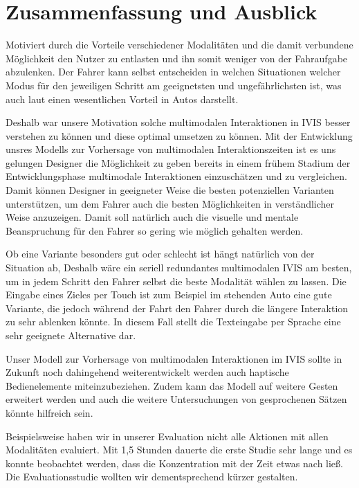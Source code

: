 \chapter{Zusammenfassung und Ausblick}\label{cha:Zusamenfassung}
Motiviert durch die Vorteile verschiedener Modalitäten und die damit verbundene Möglichkeit den Nutzer zu entlasten und ihn somit weniger von der Fahraufgabe abzulenken. Der Fahrer kann selbst entscheiden in welchen Situationen welcher Modus für den jeweiligen Schritt am geeignetsten und ungefährlichsten ist, was auch laut \citet{Muller_2011} einen wesentlichen Vorteil in Autos darstellt.

Deshalb war unsere Motivation solche multimodalen Interaktionen in IVIS besser verstehen zu können und diese optimal umsetzen zu können. Mit der Entwicklung unsres Modells zur Vorhersage von multimodalen Interaktionszeiten ist es uns gelungen Designer die Möglichkeit zu geben bereits in einem frühem Stadium der Entwicklungsphase multimodale Interaktionen einzuschätzen und zu vergleichen. Damit können Designer in geeigneter Weise die besten potenziellen Varianten unterstützen, um dem Fahrer auch die besten Möglichkeiten in verständlicher Weise anzuzeigen. Damit soll natürlich auch die visuelle und mentale Beanspruchung für den Fahrer so gering wie möglich gehalten werden. 

Ob eine Variante besonders gut oder schlecht ist hängt natürlich von der Situation ab, Deshalb wäre ein seriell redundantes multimodalen IVIS am besten, um in jedem Schritt den Fahrer selbst die beste Modalität wählen zu lassen. Die Eingabe eines Zieles per Touch ist zum Beispiel im stehenden Auto eine gute Variante, die jedoch während der Fahrt den Fahrer durch die längere Interaktion zu sehr ablenken könnte. In diesem Fall stellt die Texteingabe per Sprache eine sehr geeignete Alternative dar.

Unser Modell zur Vorhersage von multimodalen Interaktionen im IVIS sollte in Zukunft noch dahingehend weiterentwickelt werden auch haptische Bedienelemente miteinzubeziehen. Zudem kann das Modell auf weitere Gesten erweitert werden und auch die weitere Untersuchungen von gesprochenen Sätzen könnte hilfreich sein.

Beispielsweise haben wir in unserer Evaluation nicht alle Aktionen mit allen Modalitäten evaluiert. Mit 1,5 Stunden dauerte die erste Studie sehr lange und es konnte beobachtet werden, dass die Konzentration mit der Zeit etwas nach ließ. Die Evaluationsstudie wollten wir dementsprechend kürzer gestalten. 

